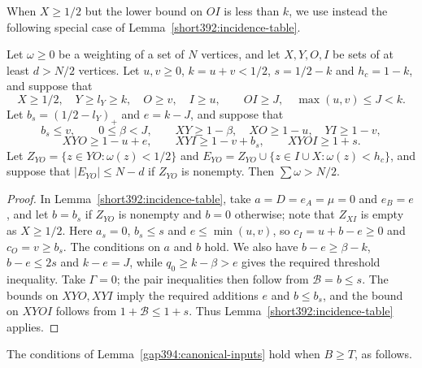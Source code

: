 When $X\ge1/2$ but the lower bound on $OI$ is less than $k$, we use instead the following special case of Lemma~\ref{short392:incidence-table}.

\begin{lemma}
\label{gap390:regular-jbad-count}
Let $\omega\ge0$ be a weighting of a set of $N$ vertices, and let $X,Y,O,I$ be sets of at least $d>N/2$ vertices. Let $u,v\ge0$, $k=u+v<1/2$, $s=1/2-k$ and
$h_c=1-k$, and suppose that
\[
 X\ge1/2,\quad Y\ge l_Y\ge k,\quad O\ge v,\quad I\ge u,
 \qquad OI\ge J,\quad \max(u,v)\le J<k.
\]
Let $b_s=(1/2-l_Y)_+$ and $e=k-J$, and suppose that
\[
 b_s\le v,\qquad 0\le\beta<J,\qquad
 XY\ge1-\beta,\quad XO\ge1-u,\quad YI\ge1-v,
\]
\[
 XYO\ge1-u+e,\qquad XYI\ge1-v+b_s,\qquad
 XYOI\ge1+s.
\]
Let $Z_{YO}=\{z\in YO:\omega(z)<1/2\}$ and
$E_{YO}=Z_{YO}\cup\{z\in I\cup X:\omega(z)<h_c\}$, and suppose that
$|E_{YO}|\le N-d$ if $Z_{YO}$ is nonempty.
Then $\sum\omega>N/2$.
\end{lemma}
\begin{proof}
In Lemma~\ref{short392:incidence-table}, take
$a=D=e_A=\mu=0$ and $e_B=e$, and let $b=b_s$ if $Z_{YO}$ is nonempty and $b=0$ otherwise; note that $Z_{XI}$ is empty as $X\ge1/2$.
Here $a_s=0$, $b_s\le s$ and $e\le\min(u,v)$, so
$c_I=u+b-e\ge0$ and $c_O=v\ge b_s$.
The conditions on $a$ and $b$ hold.
We also have $b-e\ge\beta-k$, $b-e\le2s$ and $k-e=J$,
while $q_0\ge k-\beta>e$ gives the required threshold inequality.
Take $\Gamma=0$; the pair inequalities then follow from $\mathcal B=b\le s$.
The bounds on $XYO,XYI$ imply the required additions $e$ and
$b\le b_s$, and the bound on $XYOI$ follows from $1+\mathcal B\le1+s$.
Thus Lemma~\ref{short392:incidence-table} applies.
\end{proof}

The conditions of Lemma~\ref{gap394:canonical-inputs} hold when $B\ge T$, as follows.

